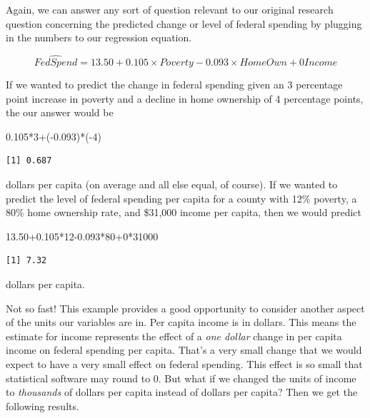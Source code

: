 \documentclass[
]{book}
\makeatletter
\newenvironment{Shaded}{\begin{snugshade}}{\end{snugshade}}
\newcommand{\DecValTok}[1]{\textcolor[rgb]{0.06,0.06,0.06}{#1}}
\newcommand{\FloatTok}[1]{\textcolor[rgb]{0.06,0.06,0.06}{#1}}
\newcommand{\NormalTok}[1]{#1}
\newcommand{\SpecialCharTok}[1]{\textcolor[rgb]{0,0,0}{#1}}
\newenvironment{kframe}{%
\medskip{}
\setlength{\fboxsep}{.8em}
 \def\at@end@of@kframe{}%
 \ifinner\ifhmode%
  \def\at@end@of@kframe{\end{minipage}}%
  \begin{minipage}{\columnwidth}%
 \fi\fi%
 \def\FrameCommand##1{\hskip\@totalleftmargin \hskip-\fboxsep
 \colorbox{shadecolor}{##1}\hskip-\fboxsep
     \hskip-\linewidth \hskip-\@totalleftmargin \hskip\columnwidth}%
 \MakeFramed {\advance\hsize-\width
   \@totalleftmargin\z@ \linewidth\hsize
   \@setminipage}}%
 {\par\unskip\endMakeFramed%
 \at@end@of@kframe}
\renewenvironment{Shaded}{\begin{kframe}}{\end{kframe}}
\makeatother
\begin{document}
Again, we can answer any sort of question relevant to our original research question concerning the predicted change or level of federal spending by plugging in the numbers to our regression equation.

\begin{equation}
\hat{FedSpend} = 13.50 + 0.105\times Poverty - 0.093\times HomeOwn + 0Income
\end{equation}

If we wanted to predict the change in federal spending given an 3 percentage point increase in poverty and a decline in home ownership of 4 percentage points, the our answer would be

\begin{Shaded}
\begin{Highlighting}[]
\FloatTok{0.105}\SpecialCharTok{*}\DecValTok{3}\SpecialCharTok{+}\NormalTok{(}\SpecialCharTok{{-}}\FloatTok{0.093}\NormalTok{)}\SpecialCharTok{*}\NormalTok{(}\SpecialCharTok{{-}}\DecValTok{4}\NormalTok{)}
\end{Highlighting}
\end{Shaded}

\begin{verbatim}
[1] 0.687
\end{verbatim}

dollars per capita (on average and all else equal, of course). If we wanted to predict the level of federal spending per capita for a county with 12\% poverty, a 80\% home ownership rate, and \$31,000 income per capita, then we would predict

\begin{Shaded}
\begin{Highlighting}[]
\FloatTok{13.50+0.105}\SpecialCharTok{*}\DecValTok{12}\FloatTok{{-}0.093}\SpecialCharTok{*}\DecValTok{80}\SpecialCharTok{+}\DecValTok{0}\SpecialCharTok{*}\DecValTok{31000}
\end{Highlighting}
\end{Shaded}

\begin{verbatim}
[1] 7.32
\end{verbatim}

dollars per capita.

Not so fast! This example provides a good opportunity to consider another aspect of the units our variables are in. Per capita income is in dollars. This means the estimate for income represents the effect of a \emph{one dollar} change in per capita income on federal spending per capita. That's a very small change that we would expect to have a very small effect on federal spending. This effect is so small that statistical software may round to 0. But what if we changed the units of income to \emph{thousands} of dollars per capita instead of dollars per capita? Then we get the following results.
\end{document}
